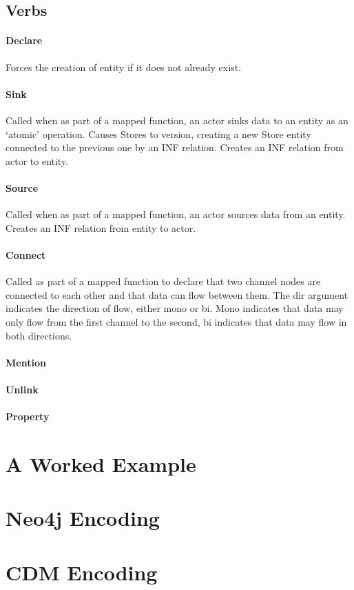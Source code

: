 \documentclass[12pt,twoside,a4paper]{article}
\newcommand{\para}[1]{\paragraph{#1\\}}
\begin{document}
\subsection{Verbs}
\label{sec:map:verbs}

\para{Declare}
\label{sec:map:verbs:declare}
Forces the creation of entity if it does not already exist.

\para{Sink}
\label{sec:map:verbs:sink}
Called when as part of a mapped function, an actor sinks data to an entity as an ‘atomic’ operation.
Causes Stores to version, creating a new Store entity connected to the previous one by an INF relation.
Creates an INF relation from actor to entity. 

\para{Source}
\label{sec:map:verbs:source}
Called when as part of a mapped function, an actor sources data from an entity.
Creates an INF relation from entity to actor.

\para{Connect}
\label{sec:map:verbs:connect}
Called as part of a mapped function to declare that two channel nodes are connected to each other and that data can flow between them. The dir argument indicates the direction of flow, either mono or bi. Mono indicates that data may only flow from the first channel to the second, bi indicates that data may flow in both directions. 

\para{Mention}
\label{sec:map:verbs:mention}

\para{Unlink}
\label{sec:map:verbs:unlink}

\para{Property}
\label{sec:map:verbs:property}

\appendix

\section{A Worked Example}
\label{app:example}

\section{Neo4j Encoding}
\label{app:enc:neo4j}

\section{CDM Encoding}
\label{app:enc:cdm}
\end{document}
